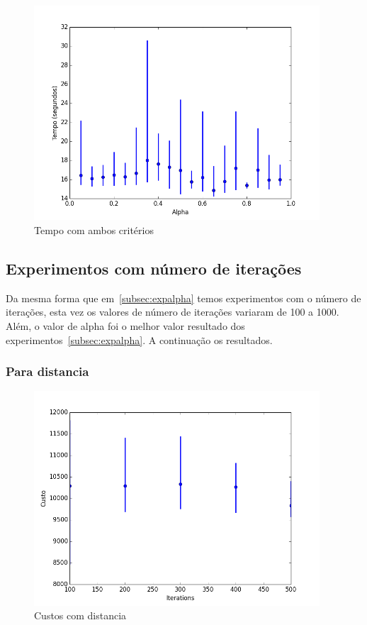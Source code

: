 		\begin{figure}[H]
			\centering
			\includegraphics[height=8cm]{images/time_both_alpha}
			\caption{Tempo com ambos critérios}
			\label{fig:timebothalpha}
		\end{figure}

 \subsection{Experimentos com número de iterações}
 	Da mesma forma que em~\ref{subsec:expalpha} temos experimentos com o número de iterações, esta vez os valores de número de iterações variaram de 100 a 1000. Além, o valor de alpha foi o melhor valor resultado dos experimentos~\ref{subsec:expalpha}. A continuação os resultados.
 	\subsubsection{Para distancia} %
		\begin{figure}[H]
			\centering
			\includegraphics[height=8cm]{images/cost_both_iterations}
			\caption{Custos com distancia}
			\label{fig:costdistanceiterations}
		\end{figure}
		
